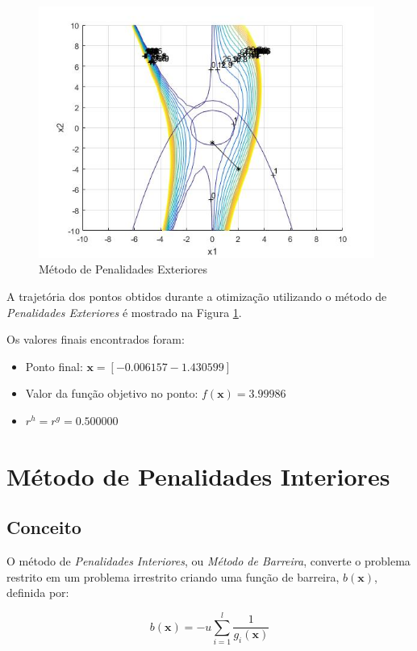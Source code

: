 \documentclass[10pt,a4paper]{article}
\begin{document}
	\begin{figure}[h]
		\centering
		\includegraphics[width=11cm]{penalidade_exterior}
		\caption{Método de Penalidades Exteriores}
		\label{penalidade_exterior}
	\end{figure}

	A trajetória dos pontos obtidos durante a otimização utilizando o método de \emph{Penalidades Exteriores} é mostrado na Figura \ref{penalidade_exterior}.

	Os valores finais encontrados foram:

	\begin{itemize}

		\item Ponto final: $\bm{x} = [-0.006157 -1.430599]$
		\item Valor da função objetivo no ponto: $f(\bm{x}) = 3.99986$
		\item $r^h = r^g = 0.500000$

	\end{itemize}

	\section{Método de Penalidades Interiores}

	\subsection{Conceito}

	O método de \emph{Penalidades Interiores}, ou \emph{Método de Barreira}, converte o problema restrito em um problema irrestrito criando uma função de barreira, $b(\bm{x})$, definida por:

	$$b(\bm{x}) = -u \sum_{i=1}^l \frac{1}{g_i(\bm{x})}$$
\end{document}
